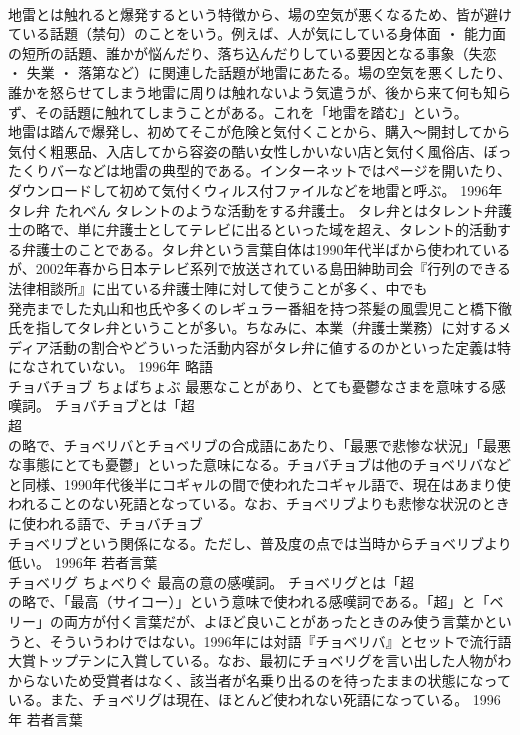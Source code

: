 \documentclass[8pt]{extreport}
\begin{document}
\begin{CJK}{UTF8}{min}
\\	地雷とは触れると爆発するという特徴から、場の空気が悪くなるため、皆が避けている話題（禁句）のことをいう。例えば、人が気にしている身体面 ・ 能力面の短所の話題、誰かが悩んだり、落ち込んだりしている要因となる事象（失恋 ・ 失業 ・ 落第など）に関連した話題が地雷にあたる。場の空気を悪くしたり、誰かを怒らせてしまう地雷に周りは触れないよう気遣うが、後から来て何も知らず、その話題に触れてしまうことがある。これを「地雷を踏む」という。 
\\	地雷は踏んで爆発し、初めてそこが危険と気付くことから、購入～開封してから気付く粗悪品、入店してから容姿の酷い女性しかいない店と気付く風俗店、ぼったくりバーなどは地雷の典型的である。インターネットではページを開いたり、ダウンロードして初めて気付くウィルス付ファイルなどを地雷と呼ぶ。	1996年	
\\	タレ弁	たれべん	タレントのような活動をする弁護士。	タレ弁とはタレント弁護士の略で、単に弁護士としてテレビに出るといった域を超え、タレント的活動する弁護士のことである。タレ弁という言葉自体は1990年代半ばから使われているが、2002年春から日本テレビ系列で放送されている島田紳助司会『行列のできる法律相談所』に出ている弁護士陣に対して使うことが多く、中でも
\\	発売までした丸山和也氏や多くのレギュラー番組を持つ茶髪の風雲児こと橋下徹氏を指してタレ弁ということが多い。ちなみに、本業（弁護士業務）に対するメディア活動の割合やどういった活動内容がタレ弁に値するのかといった定義は特になされていない。	1996年	略語	
\\	チョバチョブ	ちょばちょぶ	最悪なことがあり、とても憂鬱なさまを意味する感嘆詞。	チョバチョブとは「超 
\\	超 
\\	の略で、チョベリバとチョベリブの合成語にあたり、「最悪で悲惨な状況」「最悪な事態にとても憂鬱」といった意味になる。チョバチョブは他のチョベリバなどと同様、1990年代後半にコギャルの間で使われたコギャル語で、現在はあまり使われることのない死語となっている。なお、チョベリブよりも悲惨な状況のときに使われる語で、チョバチョブ
\\	チョベリブという関係になる。ただし、普及度の点では当時からチョベリブより低い。	1996年	若者言葉	
\\	チョベリグ	ちょべりぐ	最高の意の感嘆詞。	チョベリグとは「超 
\\	の略で、「最高（サイコー）」という意味で使われる感嘆詞である。「超」と「ベリー」の両方が付く言葉だが、よほど良いことがあったときのみ使う言葉かというと、そういうわけではない。1996年には対語『チョベリバ』とセットで流行語大賞トップテンに入賞している。なお、最初にチョベリグを言い出した人物がわからないため受賞者はなく、該当者が名乗り出るのを待ったままの状態になっている。また、チョベリグは現在、ほとんど使われない死語になっている。	1996年	若者言葉	

\end{CJK}
\end{document}
